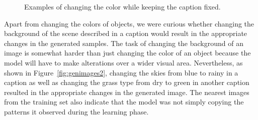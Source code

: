 \documentclass{article} %
\begin{document}
\begin{figure}[!h]
\captionsetup[subfigure]{labelformat=empty}
\begin{center}
\quad
%
\quad
%
\quad
%
\quad
%
\end{center}
\caption{Examples of changing the color while keeping the caption fixed.}
\label{fig:genimages1}
\vspace{-0.6cm}
\end{figure}

Apart from changing the colors of objects, we were curious whether changing the background of the scene described in a caption would result in the appropriate changes in the generated samples. The task of changing the background of an image is somewhat harder than just changing the color of an object because the model will have to make alterations over a wider visual area. Nevertheless, as shown in Figure~\ref{fig:genimages2}, changing the skies from blue to rainy in a caption as well as changing the grass type from dry to green in another caption resulted in the appropriate changes in the generated image. The nearest images from the training set also indicate that the model was not simply copying the patterns it observed during the learning phase.
\end{document}
